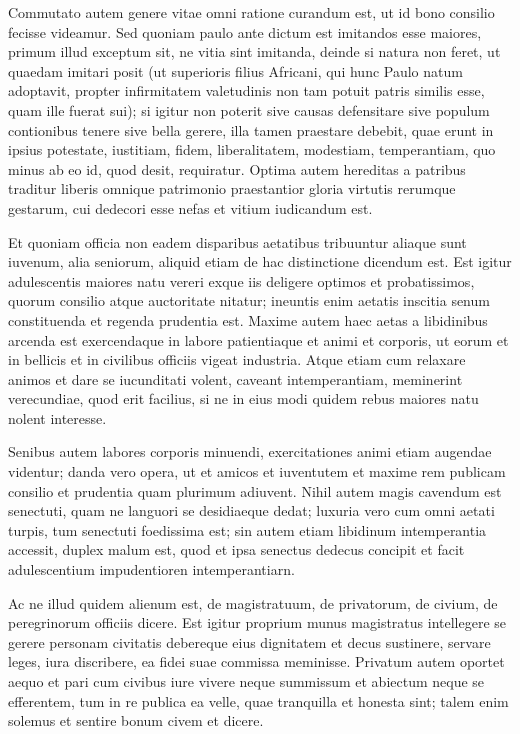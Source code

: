  Commutato autem genere vitae omni ratione curandum est, ut id bono consilio fecisse videamur. Sed quoniam paulo ante dictum est imitandos esse maiores, primum illud exceptum sit, ne vitia sint imitanda, deinde si natura non feret, ut quaedam imitari posit (ut superioris filius Africani, qui hunc Paulo natum adoptavit, propter infirmitatem valetudinis non tam potuit patris similis esse, quam ille fuerat sui); si igitur non poterit sive causas defensitare sive populum contionibus tenere sive bella gerere, illa tamen praestare debebit, quae erunt in ipsius potestate, iustitiam, fidem, liberalitatem, modestiam, temperantiam, quo minus ab eo id, quod desit, requiratur. Optima autem hereditas a patribus traditur liberis omnique patrimonio praestantior gloria virtutis rerumque gestarum, cui dedecori esse nefas et vitium iudicandum est.

 Et quoniam officia non eadem disparibus aetatibus tribuuntur aliaque sunt iuvenum, alia seniorum, aliquid etiam de hac distinctione dicendum est. Est igitur adulescentis maiores natu vereri exque iis deligere optimos et probatissimos, quorum consilio atque auctoritate nitatur; ineuntis enim aetatis inscitia senum constituenda et regenda prudentia est. Maxime autem haec aetas a libidinibus arcenda est exercendaque in labore patientiaque et animi et corporis, ut eorum et in bellicis et in civilibus officiis vigeat industria. Atque etiam cum relaxare animos et dare se iucunditati volent, caveant intemperantiam, meminerint verecundiae, quod erit facilius, si ne in eius modi quidem rebus maiores natu nolent interesse.

 Senibus autem labores corporis minuendi, exercitationes animi etiam augendae videntur; danda vero opera, ut et amicos et iuventutem et maxime rem publicam consilio et prudentia quam plurimum adiuvent. Nihil autem magis cavendum est senectuti, quam ne languori se desidiaeque dedat; luxuria vero cum omni aetati turpis, tum senectuti foedissima est; sin autem etiam libidinum intemperantia accessit, duplex malum est, quod et ipsa senectus dedecus concipit et facit adulescentium impudentioren intemperantiarn.

 Ac ne illud quidem alienum est, de magistratuum, de privatorum, de civium, de peregrinorum officiis dicere. Est igitur proprium munus magistratus intellegere se gerere personam civitatis debereque eius dignitatem et decus sustinere, servare leges, iura discribere, ea fidei suae commissa meminisse. Privatum autem oportet aequo et pari cum civibus iure vivere neque summissum et abiectum neque se efferentem, tum in re publica ea velle, quae tranquilla et honesta sint; talem enim solemus et sentire bonum civem et dicere.

